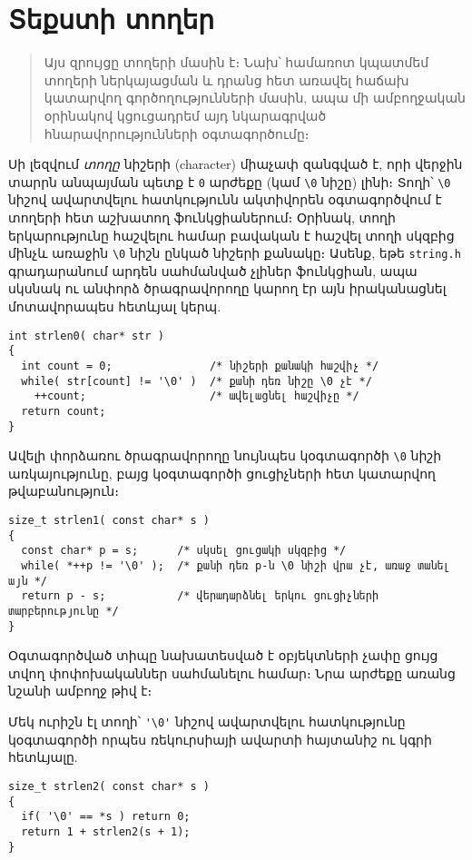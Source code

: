 \chapter{Տեքստի տողեր}
\label{cha:strings}

\begin{quote}
Այս զրույցը տողերի մասին է։ Նախ՝ համառոտ կպատմեմ տողերի
ներկայացման և դրանց հետ առավել հաճախ կատարվող գործողությունների
մասին, ապա մի ամբողջական օրինակով կցուցադրեմ այդ նկարագրված
հնարավորությունների օգտագործումը։
\end{quote}

Սի լեզվում \emph{տողը} նիշերի (character) միաչափ զանգված է, որի
վերջին տարրն անպայման պետք է \texttt{0} արժեքը (կամ \verb|\0|
նիշը) լինի։ Տողի՝ \Verb|\0| նիշով ավարտվելու հատկությունն ակտիվորեն
օգտագործվում է տողերի հետ աշխատող ֆունկցիաներում։ Օրինակ, տողի
երկարությունը հաշվելու համար բավական է հաշվել տողի սկզբից մինչև
առաջին \Verb|\0| նիշն ընկած նիշերի քանակը։ Ասենք, եթե
\texttt{string.h} գրադարանում արդեն սահմանված չլիներ 
 ֆունկցիան, ապա սկսնակ ու անփորձ ծրագրավորողը կարող էր այն
 իրականացնել մոտավորապես հետևյալ կերպ.

\begin{Verbatim}
int strlen0( char* str )
{
  int count = 0;               /* նիշերի քանակի հաշվիչ */
  while( str[count] != '\0' )  /* քանի դեռ նիշը \0 չէ */
    ++count;                   /* ավելացնել հաշվիչը */
  return count;
}
\end{Verbatim}

Ավելի փորձառու ծրագրավորողը նույնպես կօգտագործի \Verb|\0| նիշի
առկայությունը, բայց կօգտագործի ցուցիչների հետ կատարվող թվաբանություն։

\begin{Verbatim}
size_t strlen1( const char* s )
{
  const char* p = s;      /* սկսել ցուցակի սկզբից */
  while( *++p != '\0' );  /* քանի դեռ p-ն \0 նիշի վրա չէ, առաջ տանել այն */
  return p - s;           /* վերադարձնել երկու ցուցիչների տարբերությունը */
}
\end{Verbatim}

Օգտագործված  տիպը նախատեսված է օբյեկտների չափը
ցույց տվող փոփոխականներ սահմանելու համար։ Նրա արժեքը առանց
նշանի ամբողջ թիվ է։

Մեկ ուրիշն էլ տողի՝ \Verb|'\0'| նիշով ավարտվելու հատկությունը
կօգտագործի որպես ռեկուրսիայի ավարտի հայտանիշ ու կգրի հետևյալը.

\begin{Verbatim}
size_t strlen2( const char* s )
{
  if( '\0' == *s ) return 0;
  return 1 + strlen2(s + 1);
}
\end{Verbatim}

